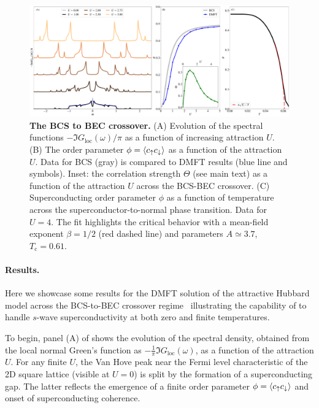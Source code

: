 \documentclass[edipack_sp.tex]{subfiles}
\begin{document}
\begin{figure}[t!]
  \includegraphics[width=\linewidth]{figures/figAHM.pdf}
    \caption{\label{figEx2}%
      \textbf{The BCS to BEC crossover.}
      (A) Evolution of the spectral functions
      $-\Im{G_\mathrm{loc}(\omega)}/\pi$ as a function of increasing
      attraction $U$. 
      (B) The order parameter $\phi=\langle c_\uparrow c_\downarrow\rangle$ as a
      function of the attraction $U$. Data for BCS (gray) is compared
      to DMFT results (blue line and symbols). Inset: the correlation strength
      $\Theta$ (see main text) as a function of the
      attraction $U$ across the BCS-BEC crossover. 
      (C) Superconducting order
      parameter $\phi$ as a function of temperature across the
      superconductor-to-normal phase transition. Data for $U=4$. The
      fit highlights the critical behavior with a mean-field exponent
      $\beta=1/2$ (red dashed line) and parameters $A\simeq 3.7$, $T_\mathrm{c}=0.61$.       
        }
\end{figure}

\paragraph{Results.}
Here we showcase some results for the DMFT solution of the 
attractive Hubbard model across the BCS-to-BEC crossover regime~\cite{Toschi2005PRB,Toschi2005NJP,Amaricci2014PRA} 
illustrating the capability of \NAME to handle $s$-wave 
superconductivity at both zero and finite temperatures.

To begin, panel (A) of  shows the evolution of the 
spectral density, obtained from the local normal Green's function as 
$-\tfrac{1}{\pi}\Im G_\mathrm{loc}(\omega)$, as a function of the 
attraction $U$. For any finite $U$, the Van Hove peak near the Fermi level characteristic of the 2D square lattice (visible at 
$U = 0$) is split by the formation of a superconducting gap. The latter reflects the emergence of a finite 
order parameter $\phi = \langle c_\uparrow c_\downarrow \rangle$ and onset of superconducting coherence.
\end{document}
